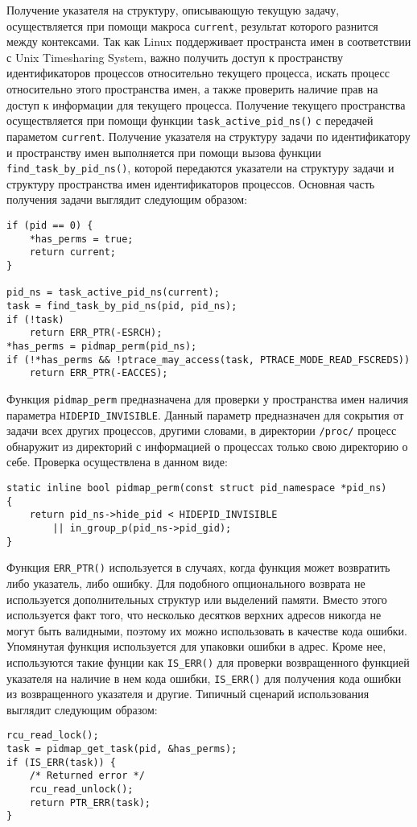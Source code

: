 Получение указателя на структуру, описывающую текущую задачу, осуществляется при
помощи макроса \texttt{current}, результат которого разнится между контексами.
Так как Linux поддерживает пространста имен в соответствии с Unix Timesharing
System, важно получить доступ к пространству идентификаторов процессов
относительно текущего процесса, искать процесс относительно этого пространства
имен, а также проверить наличие прав на доступ к информации для текущего
процесса. Получение текущего пространства осуществляется при помощи функции
\texttt{task\_active\_pid\_ns()} с передачей параметом \texttt{current}.
Получение указателя на структуру задачи по идентификатору и пространству имен
выполняется при помощи вызова функции \texttt{find\_task\_by\_pid\_ns()},
которой передаются указатели на структуру задачи и структуру пространства имен
идентификаторов процессов. Основная часть получения задачи выглядит следующим
образом:
\medskip
\begin{lstlisting}[style=cstyle]
if (pid == 0) {
	*has_perms = true;
	return current;
}

pid_ns = task_active_pid_ns(current);
task = find_task_by_pid_ns(pid, pid_ns);
if (!task)
	return ERR_PTR(-ESRCH);
*has_perms = pidmap_perm(pid_ns);
if (!*has_perms && !ptrace_may_access(task, PTRACE_MODE_READ_FSCREDS))
	return ERR_PTR(-EACCES);
\end{lstlisting}
\medskip

Функция \texttt{pidmap\_perm} предназначена для проверки у пространства имен
наличия параметра \texttt{HIDEPID\_INVISIBLE}. Данный параметр предназначен для
сокрытия от задачи всех других процессов, другими словами, в директории
\texttt{/proc/} процесс обнаружит из директорий с информацией о процессах
только свою директорию о себе. Проверка осуществлена в данном виде:
\medskip
\begin{lstlisting}[style=cstyle]
static inline bool pidmap_perm(const struct pid_namespace *pid_ns)
{
	return pid_ns->hide_pid < HIDEPID_INVISIBLE
		|| in_group_p(pid_ns->pid_gid);
}
\end{lstlisting}
\medskip

Функция \texttt{ERR\_PTR()} используется в случаях, когда функция может
возвратить либо указатель, либо ошибку. Для подобного опционального возврата
не используется дополнительных структур или выделений памяти. Вместо этого
используется факт того, что несколько десятков верхних адресов никогда не могут
быть валидными, поэтому их можно использовать в качестве кода ошибки. Упомянутая
функция используется для упаковки ошибки в адрес. Кроме нее, используются такие
фунции как \texttt{IS\_ERR()} для проверки возвращенного функцией указателя на
наличие в нем кода ошибки, \texttt{IS\_ERR()} для получения кода ошибки из
возвращенного указателя и другие. Типичный сценарий использования выглядит
следующим образом:
\medskip
\begin{lstlisting}[style=cstyle]
rcu_read_lock();
task = pidmap_get_task(pid, &has_perms);
if (IS_ERR(task)) {
	/* Returned error */
	rcu_read_unlock();
	return PTR_ERR(task);
}
\end{lstlisting}
\medskip

